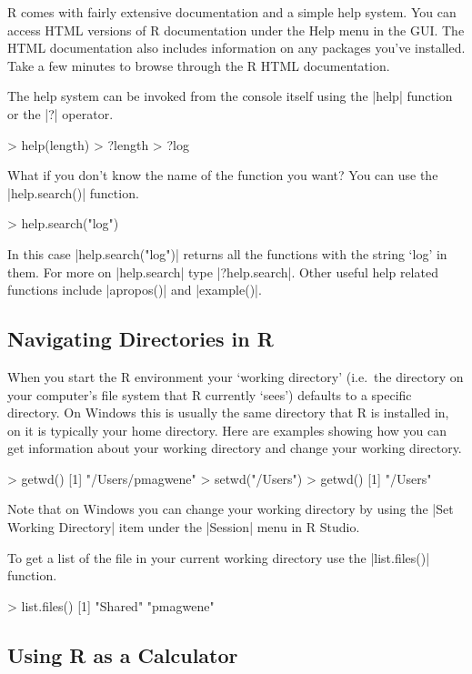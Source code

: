 R comes with fairly extensive documentation and a simple help system. You can
access HTML versions of R documentation under the Help menu in the GUI. The
HTML documentation also includes information on any packages you've installed.
Take a few minutes to browse through the R HTML documentation.

The help system can be invoked from the console itself using the
|help| function or the |?| operator.
%
\begin{R}
> help(length)
> ?length
> ?log
\end{R}
%
What if you don't know the name of the function you want? You can use
the |help.search()| function.
%
\begin{R}
> help.search("log")
\end{R}
%
In this case |help.search("log")| returns all the functions with
the string `log' in them. For more on |help.search| type
|?help.search|. Other useful help related functions include
|apropos()| and |example()|.

\subsection{Navigating Directories in R}

When you start the R environment your `working directory' (i.e.~the
directory on your computer's file system that R currently `sees')
defaults to a specific directory. On Windows this is usually the same
directory that R is installed in, on \OSX it is typically your home
directory. Here are examples showing how you can get information about
your working directory and change your working directory.
%
\begin{R}
> getwd()
[1] "/Users/pmagwene"
> setwd("/Users")
> getwd()
[1] "/Users"
\end{R}
%
Note that on Windows you can change your working directory by using the
|Set Working Directory| item under the |Session| menu in R Studio.

To get a list of the file in your current working directory use the
|list.files()| function.
%
\begin{R}
> list.files()
[1] "Shared" "pmagwene"
\end{R}



\subsection{Using R as a Calculator}

